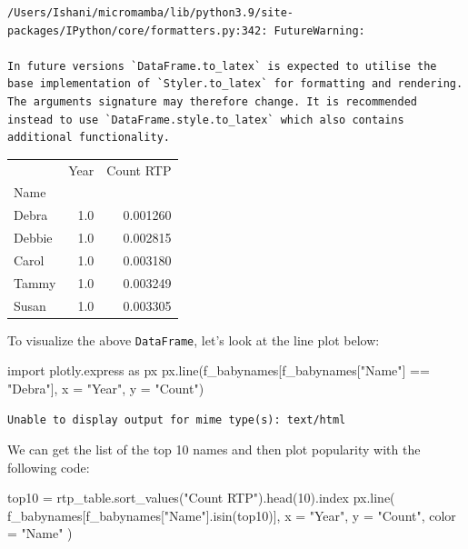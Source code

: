 \documentclass[
  letterpaper,
  DIV=11,
  numbers=noendperiod]{scrreprt}
\newenvironment{Shaded}{\begin{snugshade}}{\end{snugshade}}
\newcommand{\DecValTok}[1]{\textcolor[rgb]{0.68,0.00,0.00}{#1}}
\newcommand{\ImportTok}[1]{\textcolor[rgb]{0.00,0.46,0.62}{#1}}
\newcommand{\NormalTok}[1]{\textcolor[rgb]{0.00,0.23,0.31}{#1}}
\newcommand{\OperatorTok}[1]{\textcolor[rgb]{0.37,0.37,0.37}{#1}}
\newcommand{\StringTok}[1]{\textcolor[rgb]{0.13,0.47,0.30}{#1}}
\begin{document}
\begin{verbatim}
/Users/Ishani/micromamba/lib/python3.9/site-packages/IPython/core/formatters.py:342: FutureWarning:

In future versions `DataFrame.to_latex` is expected to utilise the base implementation of `Styler.to_latex` for formatting and rendering. The arguments signature may therefore change. It is recommended instead to use `DataFrame.style.to_latex` which also contains additional functionality.
\end{verbatim}

\begin{tabular}{lrr}
\toprule
{} &  Year &  Count RTP \\
Name   &       &            \\
\midrule
Debra  &   1.0 &   0.001260 \\
Debbie &   1.0 &   0.002815 \\
Carol  &   1.0 &   0.003180 \\
Tammy  &   1.0 &   0.003249 \\
Susan  &   1.0 &   0.003305 \\
\bottomrule
\end{tabular}

To visualize the above \texttt{DataFrame}, let's look at the line plot
below:

\begin{Shaded}
\begin{Highlighting}[]
\ImportTok{import}\NormalTok{ plotly.express }\ImportTok{as}\NormalTok{ px}
\NormalTok{px.line(f\_babynames[f\_babynames[}\StringTok{"Name"}\NormalTok{] }\OperatorTok{==} \StringTok{"Debra"}\NormalTok{], x }\OperatorTok{=} \StringTok{"Year"}\NormalTok{, y }\OperatorTok{=} \StringTok{"Count"}\NormalTok{)}
\end{Highlighting}
\end{Shaded}

\begin{verbatim}
Unable to display output for mime type(s): text/html
\end{verbatim}

We can get the list of the top 10 names and then plot popularity with
the following code:

\begin{Shaded}
\begin{Highlighting}[]
\NormalTok{top10 }\OperatorTok{=}\NormalTok{ rtp\_table.sort\_values(}\StringTok{"Count RTP"}\NormalTok{).head(}\DecValTok{10}\NormalTok{).index}
\NormalTok{px.line(}
\NormalTok{    f\_babynames[f\_babynames[}\StringTok{"Name"}\NormalTok{].isin(top10)], }
\NormalTok{    x }\OperatorTok{=} \StringTok{"Year"}\NormalTok{, }
\NormalTok{    y }\OperatorTok{=} \StringTok{"Count"}\NormalTok{, }
\NormalTok{    color }\OperatorTok{=} \StringTok{"Name"}
\NormalTok{)}
\end{Highlighting}
\end{Shaded}
\end{document}

